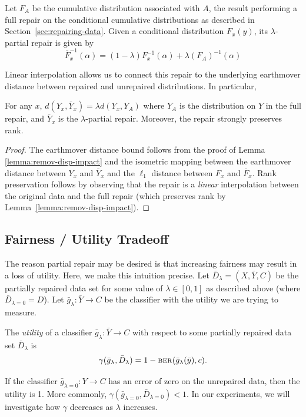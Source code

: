 \begin{defn}
Let $F_A$ be the cumulative distribution associated with $A$, the result performing a full repair on the conditional cumulative distributions as described in Section~\ref{sec:repairing-data}. 
Given a conditional distribution $F_x(y)$, its $\lambda$-partial repair is given by 
\[ \bar{F}^{-1}_x(\alpha) = (1-\lambda) F^{-1}_x(\alpha) + \lambda (F_A)^{-1}(\alpha) \]
\end{defn}

Linear interpolation allows us to connect this repair to the underlying earthmover distance between repaired and unrepaired distributions. In particular, 

\begin{theorem}
For any $x$, $ d(Y_x, \bar{Y}_x) = \lambda d(Y_x, Y_A) $
where $Y_A$ is the distribution on $Y$ in the full repair, and $\bar{Y}_x$ is the $\lambda$-partial repair. Moreover, the repair strongly preserves rank.
\end{theorem}
\begin{proof}
The earthmover distance bound follows from the proof of Lemma \ref{lemma:remov-disp-impact} and the isometric mapping between the earthmover distance between $Y_x$ and $\bar{Y}_x$ and the $\ell_1$ distance between $F_x$ and $\bar{F}_x$. Rank preservation follows by observing that the repair is a \emph{linear} interpolation between the original data  and the full repair (which preserves rank by Lemma~\ref{lemma:remov-disp-impact}). 
\end{proof}

\subsection{Fairness / Utility Tradeoff}
The reason partial repair may be desired is that increasing fairness may result in a loss of utility.  Here, we make this intuition precise.  Let $\bar{D}_\lambda = (X, \bar{Y}, C)$ be the partially repaired data set for some value of $\lambda \in [0,1]$ as described above (where $\bar{D}_{\lambda = 0} = D$).  Let $\bar{g}_\lambda \colon \bar{Y} \to C$ be the classifier with the utility we are trying to measure.  
\begin{defn}[Utility]
\label{def:utility}
The \emph{utility} of a classifier $\bar{g}_\lambda \colon \bar{Y} \to C$ with respect to some partially repaired data set $\bar{D}_\lambda$ is
\[ \gamma(\bar{g}_\lambda, \bar{D}_\lambda) = 1 - \text{\textsc{ber}}(\bar{g}_\lambda(\bar{y}), c) .\]
\end{defn}
If the classifier $\bar{g}_{\lambda=0} \colon Y \to C$ has an error of zero on the unrepaired data, then the utility is 1.  More commonly, $\gamma(\bar{g}_{\lambda=0}, \bar{D}_{\lambda=0}) < 1$.  In our experiments, we will investigate how $\gamma$ decreases as $\lambda$ increases.

